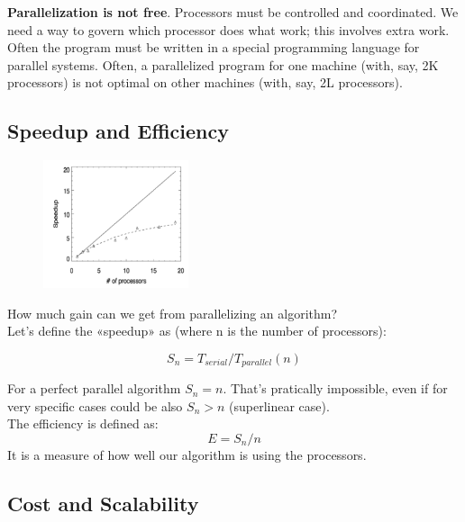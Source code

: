 \noindent
\textbf{Parallelization is not free}. Processors must be controlled and coordinated. We need a way to govern which processor does what
work; this involves extra work.\\

Often the program must be written in a special programming language for parallel systems.
Often, a parallelized program for one machine (with, say, 2K processors) is not optimal on other machines (with, say, 2L processors).


\subsection{Speedup and Efficiency}

\begin{figure}
  \begin{center}
    \includegraphics[width=0.38\textwidth]{figure_parallel/speedup.png}
  \end{center}
\end{figure}

How much gain can we get from
parallelizing an algorithm?\\
Let’s define the «speedup» as (where
n is the number of processors):

\begin{equation*}
    S_n = T_{serial}/T_{parallel}(n)
\end{equation*}

For a perfect parallel algorithm $S_n = n$. That's pratically impossible, even if for very specific cases could be also $S_n > n$ (superlinear case).\\

The efficiency is defined as:
\begin{equation}
    E = S_n/n
\end{equation}
It is a measure of how well our algorithm is using the processors.

\subsection{Cost and Scalability}

